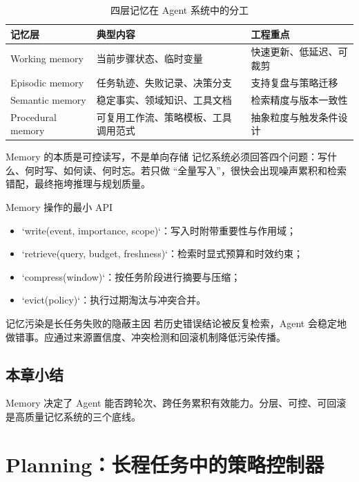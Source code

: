 \documentclass[a4paper]{article}
\begin{document}
\begin{table}[H]
\centering
\begin{tabular}{p{2.8cm}p{3.6cm}p{4.8cm}}
\toprule
\textbf{记忆层} & \textbf{典型内容} & \textbf{工程重点} \\
\midrule
Working memory & 当前步骤状态、临时变量 & 快速更新、低延迟、可裁剪 \\
Episodic memory & 任务轨迹、失败记录、决策分支 & 支持复盘与策略迁移 \\
Semantic memory & 稳定事实、领域知识、工具文档 & 检索精度与版本一致性 \\
Procedural memory & 可复用工作流、策略模板、工具调用范式 & 抽象粒度与触发条件设计 \\
\bottomrule
\end{tabular}
\caption{四层记忆在 Agent 系统中的分工}
\end{table}

\begin{importantbox}{Memory 的本质是可控读写，不是单向存储}
记忆系统必须回答四个问题：写什么、何时写、如何读、何时忘。若只做 ``全量写入''，很快会出现噪声累积和检索错配，最终拖垮推理与规划质量。
\end{importantbox}

\begin{knowledgebox}{Memory 操作的最小 API}
\begin{itemize}
    \item `write(event, importance, scope)`：写入时附带重要性与作用域；
    \item `retrieve(query, budget, freshness)`：检索时显式预算和时效约束；
    \item `compress(window)`：按任务阶段进行摘要与压缩；
    \item `evict(policy)`：执行过期淘汰与冲突合并。
\end{itemize}
\end{knowledgebox}

\begin{warningbox}{记忆污染是长任务失败的隐蔽主因}
若历史错误结论被反复检索，Agent 会稳定地做错事。应通过来源置信度、冲突检测和回滚机制降低污染传播。
\end{warningbox}

\subsection{本章小结}
Memory 决定了 Agent 能否跨轮次、跨任务累积有效能力。分层、可控、可回滚是高质量记忆系统的三个底线。

\section{Planning：长程任务中的策略控制器}
\end{document}
